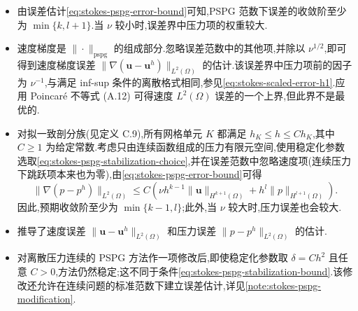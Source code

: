 \begin{note}[误差估计的讨论与其他分析结果]\label{note:stokes-pspg-error-discussion}
\begin{itemize}
\item 由误差估计\cref{eq:stokes-pspg-error-bound}可知,PSPG 范数下误差的收敛阶至少为 $\min\{k,l+1\}$.当 $\nu$ 较小时,误差界中压力项的权重较大.
\item 速度梯度是 $\|\cdot\|_{\mathrm{pspg}}$ 的组成部分.忽略误差范数中的其他项,并除以 $\nu^{1/2}$,即可得到速度梯度误差 $\|\nabla(\bm{u}-\bm{u}^h)\|_{L^2(\Omega)}$ 的估计.该误差界中压力项前的因子为 $\nu^{-1}$,与满足 inf-sup 条件的离散格式相同,参见\cref{eq:stokes-scaled-error-h1}.应用 Poincaré 不等式 (A.12) 可得速度 $L^2(\Omega)$ 误差的一个上界,但此界不是最优的.
\item 对拟一致剖分族(见定义 C.9),所有网格单元 $K$ 都满足 $h_K\leq h\leq Ch_K$,其中 $C\geq1$ 为给定常数.考虑只由连续函数组成的压力有限元空间,使用稳定化参数选取\cref{eq:stokes-pspg-stabilization-choice},并在误差范数中忽略速度项(连续压力下跳跃项本来也为零),由\cref{eq:stokes-pspg-error-bound}可得
\[
 \|\nabla(p-p^h)\|_{L^2(\Omega)}
 \leq C\left(
      \nu h^{k-1}\|\bm{u}\|_{H^{k+1}(\Omega)}
      +h^l\|p\|_{H^{l+1}(\Omega)}
 \right).
\]
因此,预期收敛阶至少为 $\min\{k-1,l\}$;此外,当 $\nu$ 较大时,压力误差也会较大.
\item \textcite{BrezziDouglas1988} 推导了速度误差 $\|\bm{u}-\bm{u}^h\|_{L^2(\Omega)}$ 和压力误差 $\|p-p^h\|_{L^2(\Omega)}$ 的估计.
\item 对离散压力连续的 PSPG 方法作一项修改后,即使稳定化参数取 $\delta=Ch^2$ 且任意 $C>0$,方法仍然稳定;这不同于条件\cref{eq:stokes-pspg-stabilization-bound}.该修改还允许在连续问题的标准范数下建立误差估计,详见\cref{note:stokes-pspg-modification}.
\end{itemize}
\end{note}

